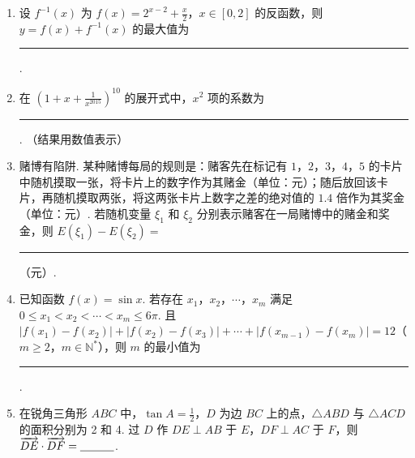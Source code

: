 \begin{description}
\begin{enumerate}[leftmargin=5pt]
        \item 设 \( f^{-1}(x) \) 为 \(f(x) = 2^{x - 2} + \frac{x}{2}\)，\(x \in [0,2]\) 的反函数，则 \( y = f(x) + f^{-1}(x) \) 的最大值为\rule[-0.3ex]{3em}{0.4pt}.

        \item 在 \(\left(1 + x + \frac{1}{x^{2015}}\right)^{10}\) 的展开式中，\(x^2\) 项的系数为\rule[-0.3ex]{3em}{0.4pt}. （结果用数值表示）

        \item 赌博有陷阱. 某种赌博每局的规则是：赌客先在标记有 \(1\)，\(2\)，\(3\)，\(4\)，\(5\) 的卡片中随机摸取一张，将卡片上的数字作为其赌金（单位：元）；随后放回该卡片，再随机摸取两张，将这两张卡片上数字之差的绝对值的 \(1.4\) 倍作为其奖金（单位：元）. 若随机变量 \(\xi_{1}\) 和 \(\xi_{2}\) 分别表示赌客在一局赌博中的赌金和奖金，则 \(E(\xi_{1}) - E(\xi_{2}) =\)\rule[-0.3ex]{3em}{0.4pt}（元）.

        \item 已知函数 \( f(x) = \sin x \). 若存在 \(x_1\)，\(x_2\)，\(\cdots\)，\(x_m\) 满足 \( 0 \leqslant x_1 < x_2 < \cdots < x_m \leqslant 6\pi \). 且 \( |f(x_1) - f(x_2)| + |f(x_2) - f(x_3)| + \cdots + |f(x_{m-1}) - f(x_m)| = 12  \)（\(m \geqslant 2\)，\(m \in \mathbb{N}^*\)），则 \( m \) 的最小值为\rule[-0.3ex]{3em}{0.4pt}.

        \item 在锐角三角形 \(ABC\) 中，\(\tan A = \frac{1}{2}\)，\(D\) 为边 \(BC\) 上的点，\(\triangle ABD\) 与 \(\triangle ACD\) 的面积分别为 2 和 4. 过 \(D\) 作 \(DE \perp AB\) 于 \(E\)，\(DF \perp AC\) 于 \(F\)，则 \(\overrightarrow{DE} \cdot \overrightarrow{DF} =\rule[-0.3ex]{3em}{0.4pt}\).

    \end{enumerate}

\end{description}


